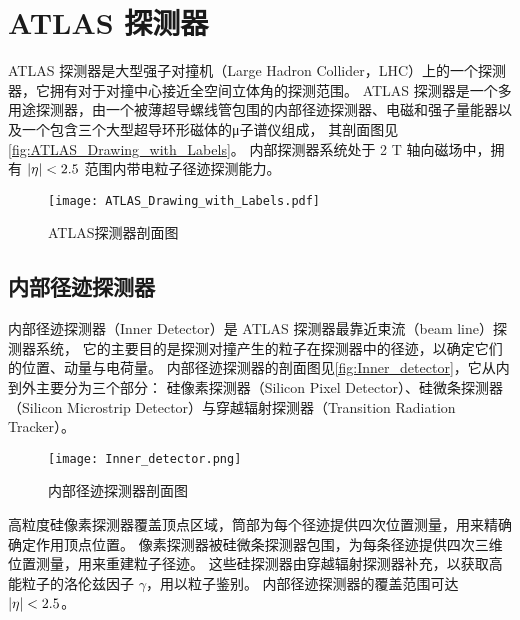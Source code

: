 
\chapter{ATLAS 探测器}
ATLAS 探测器是大型强子对撞机（Large Hadron Collider，LHC）上的一个探测器，它拥有对于对撞中心接近全空间立体角的探测范围。
ATLAS 探测器是一个多用途探测器，由一个被薄超导螺线管包围的内部径迹探测器、电磁和强子量能器以及一个包含三个大型超导环形磁体的μ子谱仪组成，
其剖面图见\autoref{fig:ATLAS_Drawing_with_Labels}。
内部探测器系统处于 2 T 轴向磁场中，拥有 $\abs{\eta} < 2.5$ 范围内带电粒子径迹探测能力。
\cite{ATLAS_detector}

\begin{figure}[ht]
    \centering
    \texttt{[image: ATLAS\_Drawing\_with\_Labels.pdf]}
    \caption{ATLAS探测器剖面图\cite{ATLAS_detector}}
    \label{fig:ATLAS_Drawing_with_Labels}
\end{figure}


\section{内部径迹探测器}
内部径迹探测器（Inner Detector）是 ATLAS 探测器最靠近束流（beam line）探测器系统，
它的主要目的是探测对撞产生的粒子在探测器中的径迹，以确定它们的位置、动量与电荷量。
内部径迹探测器的剖面图见\autoref{fig:Inner_detector}，它从内到外主要分为三个部分：
硅像素探测器（Silicon Pixel Detector）、硅微条探测器（Silicon Microstrip Detector）与穿越辐射探测器（Transition Radiation Tracker）。

\begin{figure}[ht]
    \centering
    \texttt{[image: Inner\_detector.png]}
    \caption{内部径迹探测器剖面图\cite{ATLAS_detector}}
    \label{fig:Inner_detector}
\end{figure}

高粒度硅像素探测器覆盖顶点区域，筒部为每个径迹提供四次位置测量，用来精确确定作用顶点位置。
像素探测器被硅微条探测器包围，为每条径迹提供四次三维位置测量，用来重建粒子径迹。
这些硅探测器由穿越辐射探测器补充，以获取高能粒子的洛伦兹因子 $\gamma$，用以粒子鉴别。
内部径迹探测器的覆盖范围可达 $\abs{\eta} < 2.5$。


